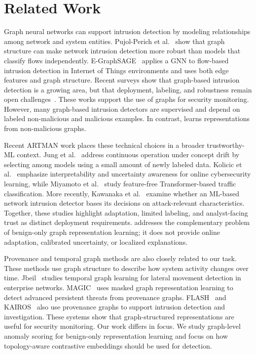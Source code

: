 \section{Related Work}\label{sec:related-work}

Graph neural networks can support intrusion detection by modeling relationships among network and system entities. Pujol-Perich et al.~\cite{pujolperich2021robustgnnids} show that graph structure can make network intrusion detection more robust than models that classify flows independently. E-GraphSAGE~\cite{lo2022egraphsage} applies a GNN to flow-based intrusion detection in Internet of Things environments and uses both edge features and graph structure. Recent surveys show that graph-based intrusion detection is a growing area, but that deployment, labeling, and robustness remain open challenges~\cite{GNN_IDS}. These works support the use of graphs for security monitoring. However, many graph-based intrusion detectors are supervised and depend on labeled non-malicious and malicious examples. In contrast, \sysname learns representations from non-malicious graphs.

Recent ARTMAN work places these technical choices in a broader trustworthy-ML context. Jung et al.~\cite{jung2023modelselection} address continuous operation under concept drift by selecting among models using a small amount of newly labeled data. Kolicic et al.~\cite{kolicic2024interpretable} emphasize interpretability and uncertainty awareness for online cybersecurity learning, while Miyamoto et al.~\cite{miyamoto2024featurefree} study feature-free Transformer-based traffic classification. More recently, Kawanaka et al.~\cite{kawanaka2025explainable} examine whether an ML-based network intrusion detector bases its decisions on attack-relevant characteristics. Together, these studies highlight adaptation, limited labeling, and analyst-facing trust as distinct deployment requirements. \sysname addresses the complementary problem of benign-only graph representation learning; it does not provide online adaptation, calibrated uncertainty, or localized explanations.

Provenance and temporal graph methods are also closely related to our task. These methods use graph structure to describe how system activity changes over time. Jbeil~\cite{Jbeil} studies temporal graph learning for lateral movement detection in enterprise networks. MAGIC~\cite{MAGIC} uses masked graph representation learning to detect advanced persistent threats from provenance graphs. FLASH~\cite{Flash} and KAIROS~\cite{cheng2024kairos} also use provenance graphs to support intrusion detection and investigation. These systems show that graph-structured representations are useful for security monitoring. Our work differs in focus. We study graph-level anomaly scoring for benign-only representation learning and focus on how topology-aware contrastive embeddings should be used for detection.

